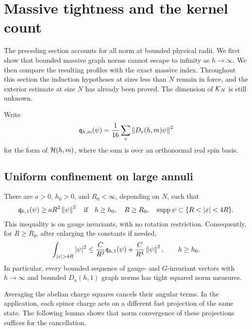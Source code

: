 \section{Massive tightness and the kernel count}
\label{sec:counting}

The preceding section accounts for all norm at bounded physical radii.
We first show that bounded massive graph norms cannot escape to infinity
as \(h\to\infty\). We then compare the resulting profiles with the exact
massive index. Throughout this section the induction hypotheses at sizes
less than \(N\) remain in force, and the exterior estimate at size \(N\)
has already been proved. The dimension of \(\mathcal K_N\) is still unknown.

Write
\[
 \mathfrak q_{h,m}(\psi)
      =\frac1{16}\sum_v\left\lVert D_v(h,m)\psi\right\rVert^2
\]
for the form of \(\mathcal H(h,m)\), where the sum is over an orthonormal real
spin basis.

\subsection{Uniform confinement on large annuli}

\begin{samepage}
\begin{proposition}\label{prop:massive-tightness}
There are \(a>0\), \(h_0>0\), and \(R_0<\infty\), depending on \(N\),
such that
\begin{equation}\label{count:annular-confinement}
 \mathfrak q_{h,1}(\psi)\ge aR^2\norm{\psi}^2
 \quad\text{if}\quad
 h\ge h_0,\quad R\ge R_0,\quad
 \supp\psi\subset\{R<|x|<4R\}.
\end{equation}
This inequality is on gauge invariants, with no rotation restriction.
Consequently, for \(R\ge R_0\), after enlarging the constants if needed,
\begin{equation}\label{count:tail-bound}
 \int_{|x|>4R}|\psi|^2
 \le\frac{C}{R^2}\mathfrak q_{h,1}(\psi)
             +\frac{C}{R^4}\norm{\psi}^2,
 \qquad h\ge h_0.
\end{equation}
In particular, every bounded sequence of gauge- and \(G\)-invariant
vectors with \(h\to\infty\) and bounded \(D_u(h,1)\) graph norms has tight
squared norm measures.
\end{proposition}
\end{samepage}

Averaging the abelian charge squares cancels their angular terms. In the
application, each spinor charge acts on a different fast projection of the
same state. The following lemma shows that norm convergence of these
projections suffices for the cancellation.

